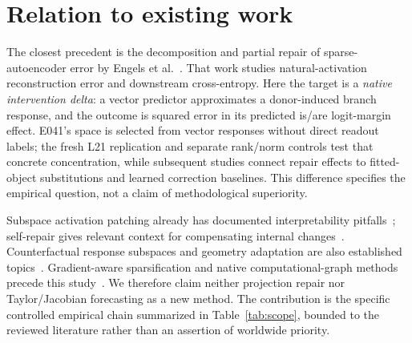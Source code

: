 \section{Relation to existing work}
The closest precedent is the decomposition and partial repair of sparse-autoencoder error by Engels et al.~\cite{engels2024}. That work studies natural-activation reconstruction error and downstream cross-entropy. Here the target is a \emph{native intervention delta}: a vector predictor approximates a donor-induced branch response, and the outcome is squared error in its predicted is/are logit-margin effect. E041's space is selected from vector responses without direct readout labels; the fresh L21 replication and separate rank/norm controls test that concrete concentration, while subsequent studies connect repair effects to fitted-object substitutions and learned correction baselines. This difference specifies the empirical question, not a claim of methodological superiority.

Subspace activation patching already has documented interpretability pitfalls~\cite{makelov2023}; self-repair gives relevant context for compensating internal changes~\cite{rushing2024}. Counterfactual response subspaces and geometry adaptation are also established topics~\cite{tang2026,lim2026}. Gradient-aware sparsification and native computational-graph methods precede this study~\cite{farnik2025,ameisen2025}. We therefore claim neither projection repair nor Taylor/Jacobian forecasting as a new method. The contribution is the specific controlled empirical chain summarized in Table~\ref{tab:scope}, bounded to the reviewed literature rather than an assertion of worldwide priority.
